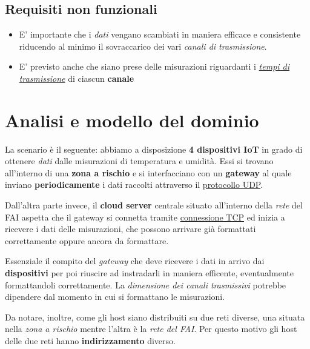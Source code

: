 \documentclass[a4paper,12pt]{report}
\begin{document}
\subsection*{Requisiti non funzionali}
\begin{itemize}
	\item E' importante che i \emph{dati} vengano scambiati in maniera efficace e consistente riducendo al minimo il sovraccarico dei vari \emph{canali di trasmissione}.
	\item E' previsto anche che siano prese delle misurazioni riguardanti i \emph{\underline{tempi di trasmissione}} di ciascun \textbf{canale}
\end{itemize}

\section{Analisi e modello del dominio}

La scenario è il seguente: abbiamo a disposizione \textbf{4 dispositivi IoT} in grado di ottenere \emph{dati} dalle misurazioni di temperatura e umidità. 
%
Essi si trovano all'interno di una \textbf{zona a rischio} e si interfacciano con un \textbf{gateway} al quale inviano \textbf{periodicamente} i dati raccolti attraverso il \underline{protocollo UDP}.

Dall'altra parte invece, il \textbf{cloud server} centrale situato all'interno della \emph{rete} del FAI aspetta che il gateway si connetta tramite \underline{connessione TCP} ed inizia a ricevere i dati delle misurazioni, che possono arrivare già formattati correttamente oppure ancora da formattare.

Essenziale il compito del \emph{gateway} che deve ricevere i dati in arrivo dai \textbf{dispositivi} per poi riuscire ad instradarli in maniera efficente, eventualmente formattandoli correttamente.
%
La \emph{dimensione dei canali trasmissivi} potrebbe dipendere dal momento in cui si formattano le misurazioni.

Da notare, inoltre, come gli host siano distribuiti su due reti diverse, una situata nella \emph{zona a rischio} mentre l'altra è la \emph{rete del FAI}.
%
Per questo motivo gli host delle due reti hanno \textbf{indirizzamento} diverso. 
\end{document}
